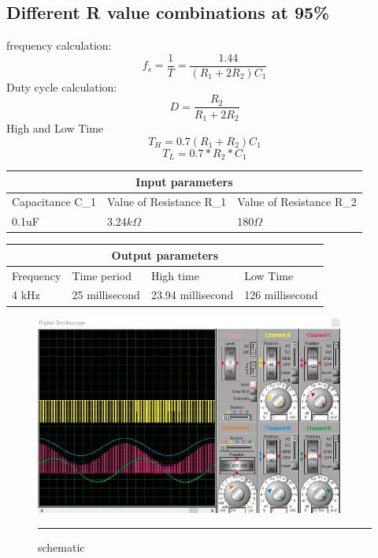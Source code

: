  \subsection{Different R value combinations at 95\%}
 frequency calculation:
   \[f_s = \frac{1}{T}=\frac{1.44}{(R_1 + 2R_2)C_1} \]
 Duty cycle calculation:
    \[D = \frac{R_2}{R_1+2R_2} \]
High and Low Time
    \[T_H=0.7(R_1 + R_2) C_1\] 
    \[T_L=0.7*R_2*C_1\] 
 \begin{center}
 \begin{tabular}{ |p{3cm}|p{3cm}|p{3cm}|  }
 	\hline
 	\multicolumn{3}{|c|}{Input parameters} \\
 	\hline
 	Capacitance C_1& Value of Resistance R_1 &Value of Resistance R_2\\
 	\hline
 	0.1uF & 3.24$k\Omega$ & 180$\Omega$\\
 	\hline
 \end{tabular}
 \end{center}
  \begin{center}
 \begin{tabular}{ |p{3cm}|p{3cm}|p{3cm}|p{3cm}| }
 	\hline
 	\multicolumn{4}{|c|}{Output parameters} \\
 	\hline
 	Frequency& Time period &High time & Low Time\\
 	\hline
 	4 kHz & 25 millisecond & 23.94 millisecond& 126 millisecond\\
 	\hline
 \end{tabular}
 \end{center}
 	\begin{figure}[htbp]
	\centering
	\includegraphics[width = 4in]{./Figures/1.jpg}
	\rule{35em}{0.5pt}
	\caption{schematic}
\end{figure}
	
